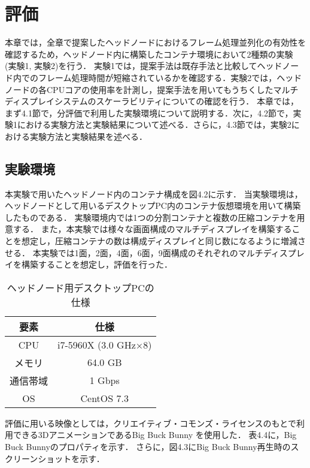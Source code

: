 \chapter{評価}
本章では，全章で提案したヘッドノードにおけるフレーム処理並列化の有効性を確認するため，ヘッドノード内に構築したコンテナ環境において2種類の実験 (実験1, 実験2)を行う．
実験1では，提案手法は既存手法と比較してヘッドノード内でのフレーム処理時間が短縮されているかを確認する．実験2では，ヘッドノードの各CPUコアの使用率を計測し，提案手法を用いてもうちくしたマルチディスプレイシステムのスケーラビリティについての確認を行う．
本章では，まず4.1節で，分評価で利用した実験環境について説明する．次に，4.2節で，実験1における実験方法と実験結果について述べる．さらに，4.3節では，実験2における実験方法と実験結果を述べる．

\section{実験環境}
本実験で用いたヘッドノード内のコンテナ構成を図4.2に示す．
当実験環境は，ヘッドノードとして用いるデスクトップPC内のコンテナ仮想環境を用いて構築したものである．
実験環境内では1つの分割コンテナと複数の圧縮コンテナを用意する．
また，本実験では様々な画面構成のマルチディスプレイを構築することを想定し，圧縮コンテナの数は構成ディスプレイと同じ数になるように増減させる．
本実験では1面，2面，4面，6面，9面構成のそれぞれのマルチディスプレイを構築することを想定し，評価を行った．

\begin{table}[H]
    \caption{ヘッドノード用デスクトップPCの仕様}
    \begin{center}
    \begin{tabular}{cc}
    \hline
    要素 & 仕様 \\\hline\hline
    CPU & i7-5960X (3.0 GHz×8) \\ \hline
    メモリ & 64.0 GB \\ \hline
    通信帯域 & 1 Gbps \\ \hline
    OS & CentOS 7.3 \\ \hline

    \end{tabular}
    \end{center}
\end{table}

評価に用いる映像としては，クリエイティブ・コモンズ・ライセンスのもとで利用できる3DアニメーションであるBig Buck Bunny \cite{bigbackbunny}を使用した．
表4.4に，Big Buck Bunnyのプロパティを示す．
さらに，図4.3にBig Buck Bunny再生時のスクリーンショットを示す．

